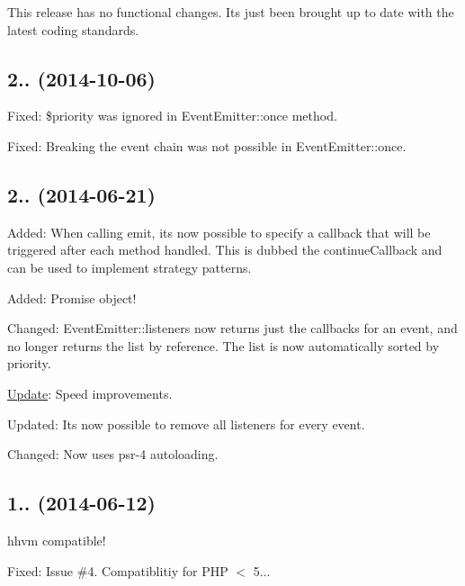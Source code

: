\begin{DoxyItemize}
\item This release has no functional changes. It\textquotesingle{}s just been brought up to date with the latest coding standards.
\end{DoxyItemize}

\subsection*{2.. (2014-\/10-\/06) }


\begin{DoxyItemize}
\item Fixed\+: {\ttfamily \$priority} was ignored in {\ttfamily Event\+Emitter\+::once} method.
\item Fixed\+: Breaking the event chain was not possible in {\ttfamily Event\+Emitter\+::once}.
\end{DoxyItemize}

\subsection*{2.. (2014-\/06-\/21) }


\begin{DoxyItemize}
\item Added\+: When calling emit, it\textquotesingle{}s now possible to specify a callback that will be triggered after each method handled. This is dubbed the \textquotesingle{}continue\+Callback\textquotesingle{} and can be used to implement strategy patterns.
\item Added\+: Promise object!
\item Changed\+: Event\+Emitter\+::listeners now returns just the callbacks for an event, and no longer returns the list by reference. The list is now automatically sorted by priority.
\item \mbox{\hyperlink{class_update}{Update}}\+: Speed improvements.
\item Updated\+: It\textquotesingle{}s now possible to remove all listeners for every event.
\item Changed\+: Now uses psr-\/4 autoloading.
\end{DoxyItemize}

\subsection*{1.. (2014-\/06-\/12) }


\begin{DoxyItemize}
\item hhvm compatible!
\item Fixed\+: Issue \#4. Compatiblitiy for P\+HP $<$ 5...
\end{DoxyItemize}


